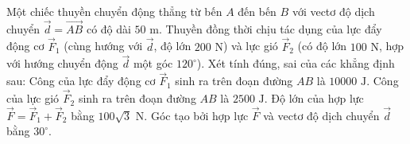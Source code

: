 \begin{ex}%
	Một chiếc thuyền chuyển động thẳng từ bến $A$ đến bến $B$ với vectơ độ dịch chuyển $\overrightarrow{d}=\overrightarrow{AB}$ có độ dài $50\text{ m}$. Thuyền đồng thời chịu tác dụng của lực đẩy động cơ $\overrightarrow{F}_1$ (cùng hướng với $\overrightarrow{d}$, độ lớn $200\text{ N}$) và lực gió $\overrightarrow{F}_2$ (có độ lớn $100\text{ N}$, hợp với hướng chuyển động $\overrightarrow{d}$ một góc $120^\circ$). Xét tính đúng, sai của các khẳng định sau:
	\choiceTF
	{\True Công của lực đẩy động cơ $\overrightarrow{F}_1$ sinh ra trên đoạn đường $AB$ là $10000\text{ J}$.}
	{Công của lực gió $\overrightarrow{F}_2$ sinh ra trên đoạn đường $AB$ là $2500\text{ J}$.}
	{\True Độ lớn của hợp lực $\overrightarrow{F}=\overrightarrow{F}_1+\overrightarrow{F}_2$ bằng $100\sqrt{3}\text{ N}$.}
	{\True Góc tạo bởi hợp lực $\overrightarrow{F}$ và vectơ độ dịch chuyển $\overrightarrow{d}$ bằng $30^\circ$.}
\end{ex}
